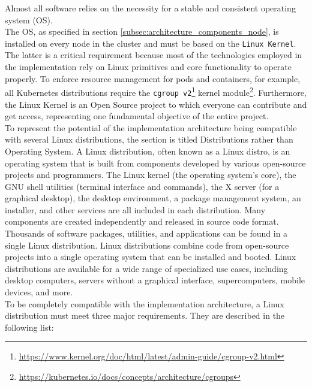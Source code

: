 Almost all software relies on the necessity for a stable and consistent
operating system (OS). \\ %
The OS, as specified in section \ref{subsec:architecture_components_node}, is
installed on every node in the cluster and must be based on the \texttt{Linux
Kernel}. The latter is a critical requirement because most of the technologies
employed in the implementation rely on Linux primitives and core functionality
to operate properly. To enforce resource management for pods and containers, for
example, all Kubernetes distributions require the \texttt{cgroup v2}\footnote{\url{https://www.kernel.org/doc/html/latest/admin-guide/cgroup-v2.html}}
kernel module\footnote{\url{https://kubernetes.io/docs/concepts/architecture/cgroups}}.
Furthermore, the Linux Kernel is an Open Source project to which everyone can
contribute and get access, representing one fundamental objective of the entire project.
\\ %
To represent the potential of the implementation architecture being compatible with
several Linux distributions, the section is titled Distributions rather than
Operating System. A Linux distribution, often known as a Linux distro, is an operating
system that is built from components developed by various open-source projects and
programmers. The Linux kernel (the operating system's core), the GNU shell utilities
(terminal interface and commands), the X server (for a graphical desktop), the desktop
environment, a package management system, an installer, and other services are
all included in each distribution. Many components are created independently and
released in source code format. Thousands of software packages, utilities, and
applications can be found in a single Linux distribution. Linux distributions combine
code from open-source projects into a single operating system that can be installed
and booted. Linux distributions are available for a wide range of specialized
use cases, including desktop computers, servers without a graphical interface, supercomputers,
mobile devices, and more\cite{linux_distro}. \\ %
To be completely compatible with the implementation architecture, a Linux distribution
must meet three major requirements. They are described in the following list:

